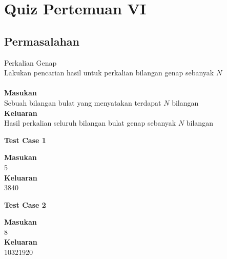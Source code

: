\chapter{Quiz Pertemuan VI}


\section{Permasalahan}
\begin{permasalahan}{Perkalian Genap}\\
\label{prob:PerkalianGenap}
	Lakukan pencarian hasil untuk perkalian bilangan genap sebanyak $N$ \\\\
	\textbf{Masukan}\\
	Sebuah bilangan bulat yang menyatakan terdapat $N$ bilangan\\
	\textbf{Keluaran}\\
	Hasil perkalian seluruh bilangan bulat genap sebanyak  $N$ bilangan
	\begin{center}
	\textbf{Test Case 1}\\
	\end{center}
	\textbf{Masukan}\\
	5\\
	\textbf{Keluaran}\\
	3840\\
	\begin{center}
	\textbf{Test Case 2}\\
	\end{center}
	\textbf{Masukan}\\
	8\\
	\textbf{Keluaran}\\
	10321920\\
\end{permasalahan}


